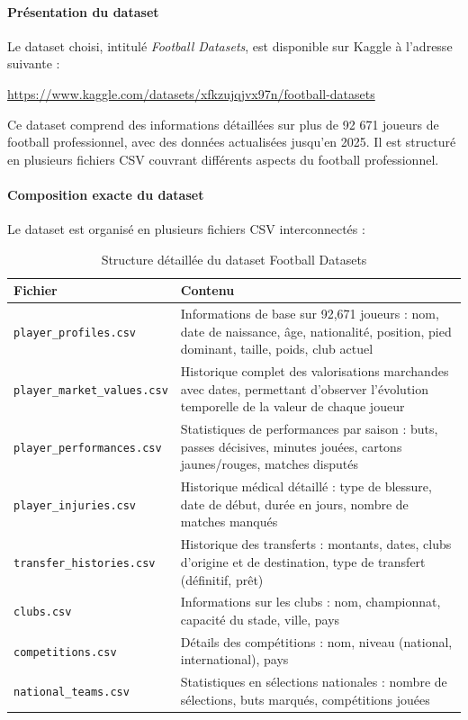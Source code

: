 \documentclass[12pt,a4paper]{article}
\begin{document}
\paragraph{Présentation du dataset}

Le dataset choisi, intitulé \textit{Football Datasets}, est disponible sur Kaggle à l'adresse suivante :

\begin{center}
\url{https://www.kaggle.com/datasets/xfkzujqjvx97n/football-datasets}
\end{center}

Ce dataset comprend des informations détaillées sur plus de 92 671 joueurs de football professionnel, avec des données actualisées jusqu'en 2025. Il est structuré en plusieurs fichiers CSV couvrant différents aspects du football professionnel.

\paragraph{Composition exacte du dataset}

Le dataset est organisé en plusieurs fichiers CSV interconnectés :

\begin{table}[h]
\centering
\begin{tabular}{@{}lp{8cm}@{}}
\toprule
\textbf{Fichier} & \textbf{Contenu} \\ \midrule
\texttt{player\_profiles.csv} & Informations de base sur 92,671 joueurs : nom, date de naissance, âge, nationalité, position, pied dominant, taille, poids, club actuel \\[0.3cm]
\texttt{player\_market\_values.csv} & Historique complet des valorisations marchandes avec dates, permettant d'observer l'évolution temporelle de la valeur de chaque joueur \\[0.3cm]
\texttt{player\_performances.csv} & Statistiques de performances par saison : buts, passes décisives, minutes jouées, cartons jaunes/rouges, matches disputés \\[0.3cm]
\texttt{player\_injuries.csv} & Historique médical détaillé : type de blessure, date de début, durée en jours, nombre de matches manqués \\[0.3cm]
\texttt{transfer\_histories.csv} & Historique des transferts : montants, dates, clubs d'origine et de destination, type de transfert (définitif, prêt) \\[0.3cm]
\texttt{clubs.csv} & Informations sur les clubs : nom, championnat, capacité du stade, ville, pays \\[0.3cm]
\texttt{competitions.csv} & Détails des compétitions : nom, niveau (national, international), pays \\[0.3cm]
\texttt{national\_teams.csv} & Statistiques en sélections nationales : nombre de sélections, buts marqués, compétitions jouées \\ \bottomrule
\end{tabular}
\caption{Structure détaillée du dataset Football Datasets}
\end{table}
\end{document}
